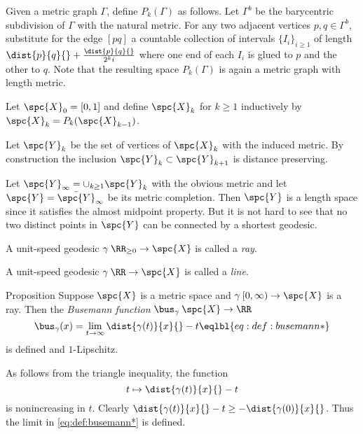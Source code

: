 
Given a metric graph $\Gamma$,  define $P_k(\Gamma)$ as follows. Let $\Gamma^b$ be the barycentric subdivision of $\Gamma$ with the natural metric. For any two adjacent vertices $p,q\in\Gamma^b$, substitute for the edge $[pq]$ a countable collection of intervals $\{I_i\}_{i\ge 1}$ of length $\dist{p}{q}{}+\frac{\dist{p}{q}{}}{2^ki}$ where one end of each $I_i$ is glued to $p$ and the other to $q$. Note that the resulting space $P_k(\Gamma)$ is again a metric graph  with length metric. 

Let $\spc{X}_0=[0,1]$ and define $\spc{X}_k$ for $k\ge 1$ inductively by $\spc{X}_k=P_k(\spc{X}_{k-1})$.

Let $\spc{Y}_k$ be the set of vertices of $\spc{X}_k$ with the induced metric. By construction the inclusion $\spc{Y}_k\subset \spc{Y}_{k+1}$ is distance preserving.

Let $\spc{Y}_\infty=\cup_{k\ge 1}\spc{Y}_k$ with the obvious metric and let $\spc{Y}=\bar {\spc{Y}}_\infty$ be its metric completion. Then $\spc{Y}$ is a length space since it satisfies the almost midpoint property. But it is not hard to see that no two distinct points in $\spc{Y}$ can be connected by a shortest geodesic. \qeds














A unit-speed geodesic $\gamma\:\RR_{\ge0}\to \spc{X}$ is called a \emph{ray}.

A unit-speed geodesic  $\gamma\:\RR\to \spc{X}$ is called a \emph{line}.

\begin{thm}{Proposition}\label{prop:busemann}
Suppose $\spc{X}$ is a metric space and $\gamma\:[0,\infty)\to \spc{X}$ is a ray. 
Then the \emph{Busemann function} $\bus_\gamma\:\spc{X}\to \RR$ 
\[\bus_\gamma(x)=\lim_{t\to\infty}\dist{\gamma(t)}{x}{}- t\eqlbl{eq:def:busemann*}\]
is defined
and $1$-Lipschitz.
\end{thm}

As  follows from the triangle inequality, the function \[t\mapsto\dist{\gamma(t)}{x}{}- t\] is nonincreasing in $t$.  
Clearly $\dist{\gamma(t)}{x}{}- t\ge-\dist{\gamma(0)}{x}{}$.
Thus the limit in \ref{eq:def:busemann*} is defined.
\qeds




















